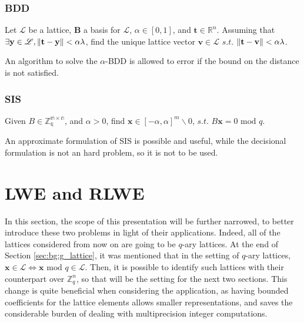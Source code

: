 \subsubsection{BDD}

\begin{definition}
Let $\mathscr{L}$ be a lattice, $\mathbf{B}$ a basis for $\mathscr{L}$, $\alpha\in[0,1]$, and $\mathbf{t}\in\mathbb{R}^n$. Assuming that $\exists \mathbf{y}\in\mathscr{L},\left\lVert \mathbf{t}-\mathbf{y} \right\rVert < \alpha\lambda$, find the unique lattice vector $\mathbf{v}\in\mathscr{L}$ $s.t.$ $\left\lVert \mathbf{t}-\mathbf{v} \right\rVert<\alpha\lambda$.
\end{definition}

\begin{remark}
An algorithm to solve the $\alpha$-BDD is allowed to error if the bound on the distance is not satisfied.
\end{remark}

\subsubsection{SIS}

\begin{definition}
Given $B\in\mathbb{Z_q^{m\times n}}$, and $\alpha > 0$, find $\mathbf{x}\in[-\alpha,\alpha]^m\backslash{0}$, $s.t.$ $B\mathbf{x}=0$ $\mathrm{mod}$ $q$.
\end{definition}

\begin{remark}
An approximate formulation of SIS is possible and useful, while the decisional formulation is not an hard problem, so it is not to be used.
\end{remark}

\section{LWE and RLWE}
In this section, the scope of this presentation will be further narrowed, to better introduce these two problems in light of their applications. Indeed, all of the lattices considered from now on are going to be $q$-ary lattices. At the end of Section \ref{sec:bg:g_lattice}, it was mentioned that in the setting of $q$-ary lattices, $\mathbf{x}\in\mathscr{L}\Leftrightarrow\mathbf{x}$ $\mathrm{mod}$ $q\in\mathscr{L}$. Then, it is possible to identify such lattices with their counterpart over $\mathbb{Z}_q^n$, so that will be the setting for the next two sections. This change is quite beneficial when considering the application, as having bounded coefficients for the lattice elements allows smaller representations, and saves the considerable burden of dealing with  multiprecision integer computations. \\

